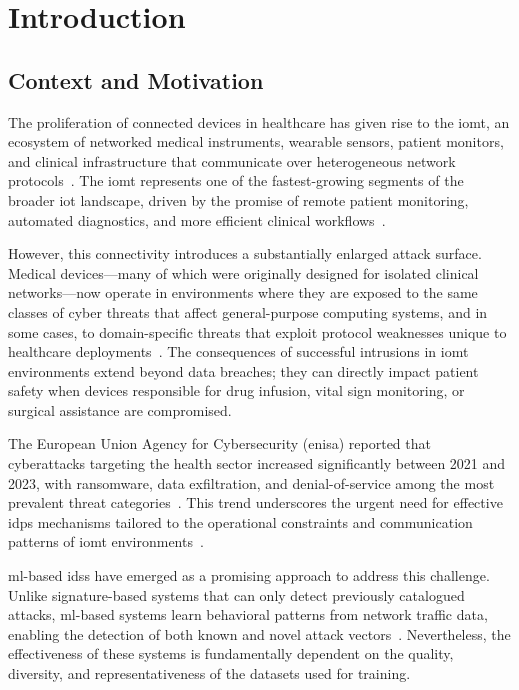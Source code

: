 \chapter{Introduction}
\label{ch:introduction}

\section{Context and Motivation}
\label{sec:context}

The proliferation of connected devices in healthcare has given rise to the \gls{iomt}, an ecosystem of networked medical instruments, wearable sensors, patient monitors, and clinical infrastructure that communicate over heterogeneous network protocols~\cite{domenech2024ensuring}. The \gls{iomt} represents one of the fastest-growing segments of the broader \gls{iot} landscape, driven by the promise of remote patient monitoring, automated diagnostics, and more efficient clinical workflows~\cite{enisa2023health}.

However, this connectivity introduces a substantially enlarged attack surface. Medical devices---many of which were originally designed for isolated clinical networks---now operate in environments where they are exposed to the same classes of cyber threats that affect general-purpose computing systems, and in some cases, to domain-specific threats that exploit protocol weaknesses unique to healthcare deployments~\cite{domenech2024ensuring}. The consequences of successful intrusions in \gls{iomt} environments extend beyond data breaches; they can directly impact patient safety when devices responsible for drug infusion, vital sign monitoring, or surgical assistance are compromised.

The European Union Agency for Cybersecurity (\gls{enisa}) reported that cyberattacks targeting the health sector increased significantly between 2021 and 2023, with ransomware, data exfiltration, and denial-of-service among the most prevalent threat categories~\cite{enisa2023health}. This trend underscores the urgent need for effective \gls{idps} mechanisms tailored to the operational constraints and communication patterns of \gls{iomt} environments~\cite{domenech2026robust}.

\Gls{ml}-based \glspl{ids} have emerged as a promising approach to address this challenge. Unlike signature-based systems that can only detect previously catalogued attacks, \gls{ml}-based systems learn behavioral patterns from network traffic data, enabling the detection of both known and novel attack vectors~\cite{chio2018machine}. Nevertheless, the effectiveness of these systems is fundamentally dependent on the quality, diversity, and representativeness of the datasets used for training.

